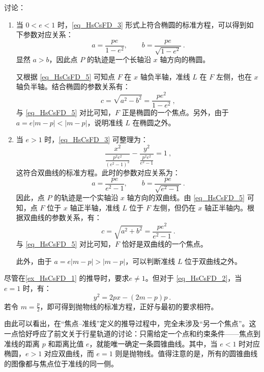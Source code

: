 \begin{example}
讨论：
\begin{enumerate}
\item 当 $0 < e < 1$ 时，\autoref{eq_HsCsFD_3} 形式上符合椭圆的标准方程，可以得到如下参数对应关系：
\begin{equation}
a = \frac{p e}{1 - e^2}, \qquad b = \frac{p e}{\sqrt{1 - e^2}}~.
\end{equation}
显然 $a > b$，因此点 $P$ 的轨迹是一个长轴沿 $x$ 轴方向的椭圆。

又根据 \autoref{eq_HsCsFD_5} 可知点 $F$ 在 $x$ 轴负半轴，准线 $L$ 在 $F$ 左侧，也在 $x$ 轴负半轴。结合椭圆的参数关系有：
\begin{equation}\label{eq_HsCsFD_6}
c = \sqrt{a^2 - b^2} = \frac{p e^2}{1 - e^2}~,
\end{equation}
与 \autoref{eq_HsCsFD_5} 对比可知，$F$ 正是椭圆的一个焦点。另外，由于 $a = e |m - p| < |m - p|$，说明准线 $L$ 在椭圆之外。

\item 当 $e > 1$ 时，\autoref{eq_HsCsFD_3} 可整理为：
\begin{equation}
\frac{x^2}{\displaystyle\frac{p^2 e^2}{(e^2 - 1)^2}} - \frac{y^2}{\displaystyle\frac{p^2 e^2}{e^2 - 1}} = 1~,
\end{equation}
这符合双曲线的标准方程。此时的参数对应关系为：
\begin{equation}
a = \frac{p e}{e^2 - 1}, \qquad b = \frac{p e}{\sqrt{e^2 - 1}}~.
\end{equation}
因此，点 $P$ 的轨迹是一个实轴沿 $x$ 轴方向的双曲线。由 \autoref{eq_HsCsFD_5} 可知，点 $F$ 位于 $x$ 轴正半轴，准线 $L$ 位于 $F$ 左侧，但仍在 $x$ 轴正半轴内。根据双曲线的参数关系，有：
\begin{equation}
c = \sqrt{a^2 + b^2} = \frac{p e^2}{e^2 - 1}~.
\end{equation}
与 \autoref{eq_HsCsFD_5} 对比可知，$F$ 恰好是双曲线的一个焦点。

此外，由于 $a = e |m - p| > |m - p|$，可以判断准线 $L$ 位于双曲线之外。
\end{enumerate}
\end{example}

尽管在\autoref{ex_HsCsFD_1} 的推导时，要求$e\neq1$。但对于 \autoref{eq_HsCsFD_2}，当 $e = 1$ 时，有：
\begin{equation}
y^2 = 2px - (2m - p)p~.
\end{equation}
若令 $\displaystyle m = \frac{p}{2}$，即可得到抛物线的标准方程，正好与最初的要求相符。

由此可以看出，在“焦点–准线”定义的推导过程中，完全未涉及“另一个焦点”。这一点恰好呼应了前文关于行星轨道的讨论：只需给定一个点和约束条件——焦点到准线的距离 $p$ 和距离比值 $e$，就能唯一确定一条圆锥曲线。其中，当 $e < 1$ 时对应椭圆，$e > 1$ 对应双曲线，而 $e = 1$ 则是抛物线。值得注意的是，所有的圆锥曲线的图像都与焦点位于准线的同一侧。

